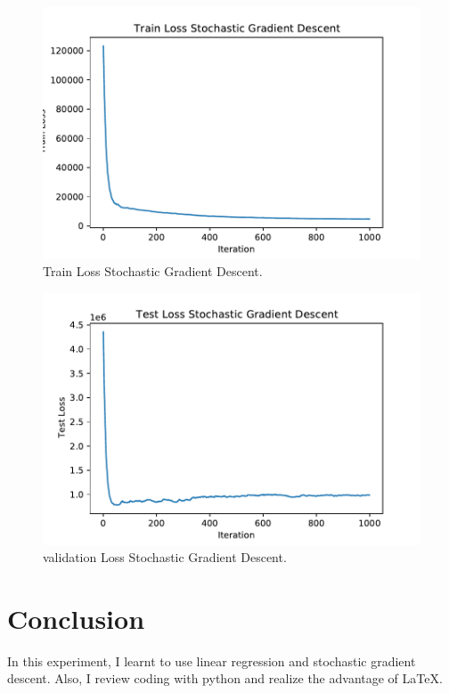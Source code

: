 \documentclass[journal, a4paper]{IEEEtran}
\begin{document}
	\begin{figure}[!hbt]
		\begin{center}
		\includegraphics[width=\columnwidth]{lab1_sto_sam_train}
		\caption{Train Loss Stochastic Gradient Descent.}
		\end{center}
	\end{figure}
	\begin{figure}[!hbt]
		\begin{center}
		\includegraphics[width=\columnwidth]{lab1_sto_sam_test}
		\caption{validation Loss Stochastic Gradient Descent.}
		\end{center}
	\end{figure}


\section{Conclusion}
	In this experiment, I learnt to use linear regression and stochastic gradient descent. Also, I review coding with python and realize the advantage of LaTeX.



\end{document}
